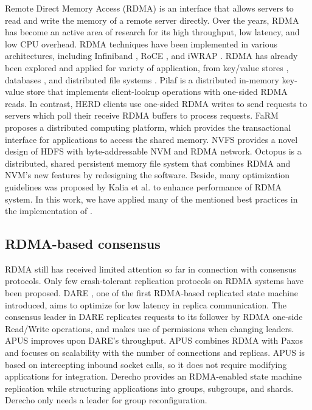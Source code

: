 Remote Direct Memory Access (RDMA) \cite{kalia2016design} is an interface that
allows servers to read and write the memory of a remote server directly. Over
the years, RDMA has become an active area of research for its high throughput,
low latency, and low CPU overhead. RDMA techniques have been implemented in
various architectures, including Infiniband \cite{pfister2001introduction}, RoCE
\cite{beck2011performance}, and iWRAP \cite{rashti200710}. RDMA has already been
explored and applied for variety of application, from key/value stores
\cite{FaRM, kalia2014using, mitchell2013using, wei2015fast}, databases
\cite{binnig2015end, huang2019rdma}, and distributed file systems
\cite{islam2012high, li2009early, wu2003pvfs}. Pilaf \cite{mitchell2013using} is
a distributed in-memory key-value store that implements client-lookup operations
with one-sided RDMA reads. In contrast, HERD \cite{kalia2014using} clients use
one-sided RDMA writes to send requests to servers which poll their receive RDMA
buffers to process requests. FaRM \cite{FaRM} proposes a distributed computing
platform, which provides the transactional interface for applications to access
the shared memory. NVFS \cite{islam2012high} provides a novel design of HDFS
with byte-addressable NVM and RDMA network. Octopus \cite{lu2017octopus} is a
distributed, shared persistent memory file system that combines RDMA and NVM's
new features by redesigning the software. Beside, many optimization guidelines
was proposed by Kalia et al. \cite{kalia2016design} to enhance performance of
RDMA system. In this work, we have applied many of the mentioned best practices
in the implementation of \libname.


\subsection{RDMA-based consensus}
\label{sec:rwrdmacons}

RDMA still has received limited attention so far in connection with consensus
protocols. Only few crash-tolerant replication protocols on RDMA systems
have been proposed. DARE \cite{DARE}, one of the first RDMA-based replicated
state machine introduced, aims to optimize for low latency in replica
communication. The consensus leader in DARE replicates requests to its follower
by RDMA one-side Read/Write operations, and makes use of permissions when
changing leaders. APUS \cite{APUS} improves upon DARE’s throughput. APUS
combines RDMA with Paxos and focuses on scalability with the number of
connections and replicas. APUS is based on intercepting inbound socket calls, so
it does not require modifying applications for integration. Derecho
\cite{jha2019derecho} provides an RDMA-enabled state machine replication while
structuring applications into groups, subgroups, and shards. Derecho only needs
a leader for group reconfiguration. 

